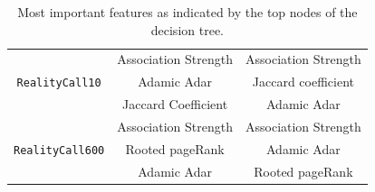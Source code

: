 \documentclass{acm_proc_article-sp}
\begin{document}
\begin{table}
{\begin{tabular}{ c c c}
			\midrule
			\multirow{3}{*}{\texttt{RealityCall10}} & Association Strength & Association Strength\\
			& Adamic Adar & Jaccard coefficient\\
			& Jaccard Coefficient & Adamic Adar\\
			\midrule
			\multirow{3}{*}{\texttt{RealityCall600}} & Association Strength & Association Strength \\
			& Rooted pageRank & Adamic Adar\\
			& Adamic Adar & Rooted pageRank\\
			\midrule
	\end{tabular}}
	\caption{Most important features as indicated by the top nodes of the decision tree.}
	\label{feature_importance}
\end{table}
	
\end{document}
